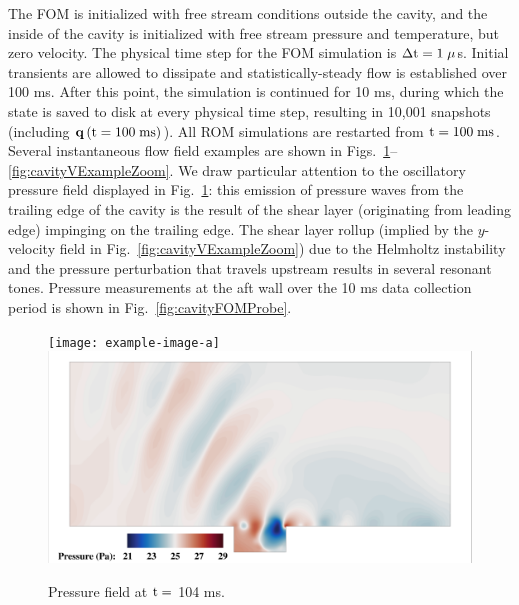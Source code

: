 The FOM is initialized with free stream conditions outside the cavity, and the inside of the cavity is initialized with free stream pressure and temperature, but zero velocity. The physical time step for the FOM simulation is $\Delta \text{t} = 1 \;\mu$s. Initial transients are allowed to dissipate and statistically-steady flow is established over 100 ms. After this point, the simulation is continued for 10 ms, during which the state is saved to disk at every physical time step, resulting in 10,001 snapshots (including $\mathbf{q}\left(\text{t} = 100 \; \text{ms}\right)$). All ROM simulations are restarted from $\text{t} = 100 \; \text{ms}$. Several instantaneous flow field examples are shown in Figs.~\ref{fig:cavityPressExample}--\ref{fig:cavityVExampleZoom}. We draw particular attention to the oscillatory pressure field displayed in Fig.~\ref{fig:cavityPressExample}: this emission of pressure waves from the trailing edge of the cavity is the result of the shear layer (originating from leading edge) impinging on the trailing edge. The shear layer rollup (implied by the $y$-velocity field in Fig.~\ref{fig:cavityVExampleZoom}) due to the Helmholtz instability and the pressure perturbation that travels upstream results in several resonant tones. Pressure measurements at the aft wall over the 10 ms data collection period is shown in Fig.~\ref{fig:cavityFOMProbe}.

\begin{figure}
	\centering
	\ifdefined\DRAFT
		\texttt{[image: example-image-a]}
	\else
		\includegraphics[width=0.9\linewidth,trim={0.5em 0.5em 0.5em 0.5em},clip]{Chapters/CavityAndCVRC/Images/cavity/pressure_example_full.png}
	\fi
	\caption{\label{fig:cavityPressExample}Pressure field at $\text{t} =$ 104 ms.}
\end{figure}

